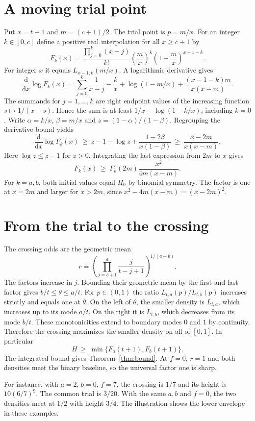 \documentclass[11pt,a4paper]{amsart}
\begin{document}
\section{A moving trial point}
Put $x=t+1$ and $m=(c+1)/2$. The trial point is $p=m/x$. For an integer $k\in[0,c]$ define a positive real interpolation for all $x\ge c+1$ by
\[
 F_k(x)=\frac{\prod_{j=0}^k(x-j)}{k!}
          \left(\frac{m}{x}\right)^k
          \left(1-\frac{m}{x}\right)^{x-1-k}.
\]
For integer $x$ it equals $L_{x-1,k}(m/x)$. A logarithmic derivative gives
\[
 \frac{\mathrm d}{\mathrm dx}\log F_k(x)
 =\sum_{j=0}^{k}\frac1{x-j}-\frac{k}{x}
   +\log(1-m/x)
   +\frac{(x-1-k)m}{x(x-m)}.
\]
The summands for $j=1,\ldots,k$ are right endpoint values of the increasing function $s\mapsto 1/(x-s)$. Hence the sum is at least $1/x-\log(1-k/x)$, including $k=0$. Write $\alpha=k/x$, $\beta=m/x$ and $z=(1-\alpha)/(1-\beta)$. Regrouping the derivative bound yields
\[
 \frac{\mathrm d}{\mathrm dx}\log F_k(x)
 \ \ge\ z-1-\log z+\frac{1-2\beta}{x(1-\beta)}
 \ \ge\ \frac{x-2m}{x(x-m)}.
\]
Here $\log z\le z-1$ for $z>0$. Integrating the last expression from $2m$ to $x$ gives
\[
 F_k(x)\ \ge\ F_k(2m)\frac{x^2}{4m(x-m)}.
\]
For $k=a,b$, both initial values equal $H_0$ by binomial symmetry. The factor is one at $x=2m$ and larger for $x>2m$, since $x^2-4m(x-m)=(x-2m)^2$.

\section{From the trial to the crossing}
The crossing odds are the geometric mean
\[
 r=\left(\prod_{j=b+1}^{a}\frac{j}{t-j+1}\right)^{1/(a-b)}.
\]
The factors increase in $j$. Bounding their geometric mean by the first and last factor gives $b/t\le \theta\le a/t$. For $p\in(0,1)$ the ratio $L_{t,a}(p)/L_{t,b}(p)$ increases strictly and equals one at $\theta$. On the left of $\theta$, the smaller density is $L_{t,a}$, which increases up to its mode $a/t$. On the right it is $L_{t,b}$, which decreases from its mode $b/t$. These monotonicities extend to boundary modes $0$ and $1$ by continuity. Therefore the crossing maximizes the smaller density on all of $[0,1]$. In particular
\[
       H\ \ge\ \min\bigl\{F_a(t+1),F_b(t+1)\bigr\}.
\]
The integrated bound gives Theorem~\ref{thm:bound}. At $f=0$, $r=1$ and both densities meet the binary baseline, so the universal factor one is sharp.

For instance, with $a=2$, $b=0$, $f=7$, the crossing is $1/7$ and its height is $10(6/7)^9$. The common trial is $3/20$. With the same $a,b$ and $f=0$, the two densities meet at $1/2$ with height $3/4$. The illustration shows the lower envelope in these examples.
\end{document}
